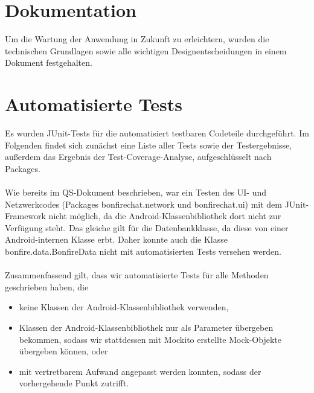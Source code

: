 




\clearpage
\section{Dokumentation}

Um die Wartung der Anwendung in Zukunft zu erleichtern, wurden die technischen Grundlagen
sowie alle wichtigen Designentscheidungen in einem Dokument festgehalten.






\clearpage
\section{Automatisierte Tests}

Es wurden JUnit-Tests für die automatisiert testbaren Codeteile durchgeführt.
Im Folgenden findet sich zunächst eine Liste aller Tests sowie der Testergebnisse,
außerdem das Ergebnis der Test-Coverage-Analyse, aufgeschlüsselt nach Packages.
\\\\
Wie bereits im QS-Dokument beschrieben, war ein Testen des UI- und Netzwerkcodes
(Packages bonfirechat.network und bonfirechat.ui)
mit dem JUnit-Framework nicht möglich, da die Android-Klassenbibliothek dort nicht
zur Verfügung steht. Das gleiche gilt für die Datenbankklasse, da diese von einer
Android-internen Klasse erbt. Daher konnte auch die Klasse bonfire.data.BonfireData
nicht mit automatisierten Tests versehen werden.
\\\\
Zusammenfassend gilt, dass wir automatisierte Tests für alle Methoden geschrieben haben,
die
\begin{itemize}
\item keine Klassen der Android-Klassenbibliothek verwenden,
\item Klassen der Android-Klassenbibliothek nur als Parameter übergeben bekommen,
sodass wir stattdessen mit Mockito erstellte Mock-Objekte übergeben können, oder
\item mit vertretbarem Aufwand angepasst werden konnten, sodass der vorhergehende Punkt zutrifft.
\end{itemize}

